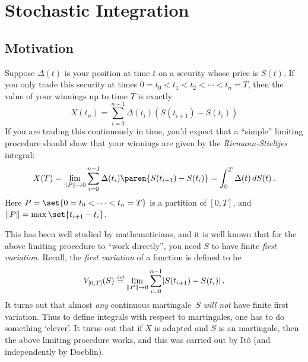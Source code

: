 
\ifstandalonechapter\setcounter{chapter}{2}\fi
\chapter{Stochastic Integration}

\section{Motivation}
Suppose $\Delta(t)$ is your position at time $t$ on a security whose price is $S(t)$.
If you only trade this security at times $0 = t_0 < t_1 < t_2 < \cdots < t_n = T$, then the value of your winnings up to time $T$ is exactly
\begin{equation*}
  X(t_n) = \sum_{i=0}^{n-1} \Delta(t_i) ( S(t_{i+1}) - S(t_i) )
\end{equation*}
If you are trading this continuously in time, you'd expect that a ``simple'' limiting procedure should show that your winnings are given by the \emph{Riemann-Stieltjes} integral:
\begin{equation*}%
  X(T) = 
    \lim_{\norm{P} \to 0}
      \sum_{i=0}^{n-1} \Delta(t_i) \paren{ S( t_{i+1} ) - S( t_i ) }
    = \int_0^T \Delta(t) \, dS(t) \,.
\end{equation*}
Here $P = \set{0 = t_0 < \cdots < t_n = T}$ is a partition of $[0, T]$, and $\norm{P} = \max\set{ t_{i+1} - t_i }$.


This has been well studied by mathematicians, and it is well known that for the above limiting procedure to ``work directly'', you need $S$ to have finite \emph{first variation}.
Recall, the \emph{first variation} of a function is defined to be
\begin{equation*}
  V_{[0,T]}(S) \stackrel{\scriptscriptstyle\textup{def}}{=} \lim_{\lVert P\rVert \to 0} \sum_{i=0}^{n-1} \lvert S(t_{i+1}) - S(t_i)\rvert\,.
\end{equation*}
It turns out that almost \emph{any} continuous martingale~$S$ \emph{will not} have finite first variation.
Thus to define integrals with respect to martingales, one has to do something `clever'.
It turns out that if $X$ is adapted and $S$ is an martingale, then the above limiting procedure works, and this was carried out by It\^o (and independently by Doeblin).

